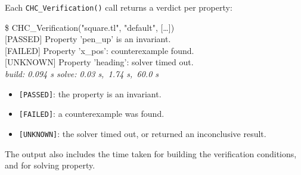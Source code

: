 Each \texttt{CHC\_Verification()} call returns a verdict per property:


\colorbox{gray!12}{\begin{minipage}{0.94\linewidth}\ttfamily
\$ CHC\_Verification("square.tl", "default", [\ldots])\\[0.3em]
\textcolor{green!50!black}{[PASSED]} Property 'pen\_up' is an invariant.\\
\textcolor{red!70!black}{[FAILED]} Property 'x\_pos': counterexample found.\\
\textcolor{orange!70!black}{[UNKNOWN]} Property 'heading': solver timed out.\\[0.3em]
\normalfont\itshape build: 0.094 s \enspace solve: 0.03 s,\ 1.74 s,\ 60.0 s
\end{minipage}}

\begin{itemize}
    \item \textcolor{green!50!black}{\texttt{[PASSED]}}: the property is an invariant.
    \item \textcolor{red!70!black}{\texttt{[FAILED]}}: a counterexample was found.
    \item \textcolor{orange!70!black}{\texttt{[UNKNOWN]}}: the solver timed out, or returned an inconclusive result.
\end{itemize}
The output also includes the time taken for building the verification conditions, and for solving property.